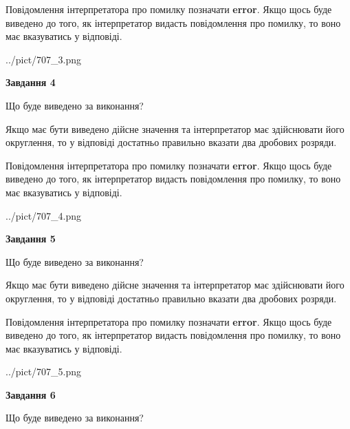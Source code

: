 \documentclass[12pt, ukrainian]{article}
\begin{document}
{\begin {Large}
Повідомлення інтерпретатора про помилку позначати \textbf{error}.
Якщо щось буде виведено до того, як інтерпретатор видасть повідомлення про помилку, 
то воно має вказуватись у відповіді. \par

\begin{center}
	{../pict/707_3.png}
\end{center}
\newpage

{\begin {center}\textbf{Завдання 4}\end {center}}\par
Що буде виведено за виконання? \par

Якщо має бути виведено дійсне значення та інтерпретатор має здійснювати його округлення, 
то у відповіді достатньо правильно вказати два дробових розряди.

Повідомлення інтерпретатора про помилку позначати \textbf{error}.
Якщо щось буде виведено до того, як інтерпретатор видасть повідомлення про помилку, 
то воно має вказуватись у відповіді. \par

\begin{center}
	{../pict/707_4.png}
\end{center}
\newpage

{\begin {center}\textbf{Завдання 5}\end {center}}\par
Що буде виведено за виконання? \par

Якщо має бути виведено дійсне значення та інтерпретатор має здійснювати його округлення, 
то у відповіді достатньо правильно вказати два дробових розряди.

Повідомлення інтерпретатора про помилку позначати \textbf{error}.
Якщо щось буде виведено до того, як інтерпретатор видасть повідомлення про помилку, 
то воно має вказуватись у відповіді. \par

\begin{center}
	{../pict/707_5.png}
\end{center}
\newpage

{\begin {center}\textbf{Завдання 6}\end {center}}\par
Що буде виведено за виконання? \par


\end{Large}}
\end{document}
